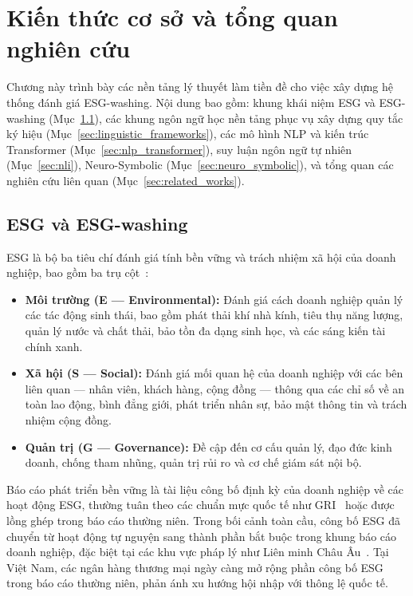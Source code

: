 \chapter{Kiến thức cơ sở và tổng quan nghiên cứu}
\label{ch:theory}

Chương này trình bày các nền tảng lý thuyết làm tiền đề cho việc xây dựng hệ thống đánh giá ESG-washing. Nội dung bao gồm: khung khái niệm ESG và ESG-washing (Mục~\ref{sec:esg_framework}), các khung ngôn ngữ học nền tảng phục vụ xây dựng quy tắc ký hiệu (Mục~\ref{sec:linguistic_frameworks}), các mô hình NLP và kiến trúc Transformer (Mục~\ref{sec:nlp_transformer}), suy luận ngôn ngữ tự nhiên (Mục~\ref{sec:nli}), Neuro-Symbolic (Mục~\ref{sec:neuro_symbolic}), và tổng quan các nghiên cứu liên quan (Mục~\ref{sec:related_works}).

\section{ESG và ESG-washing}
\label{sec:esg_framework}

ESG là bộ ba tiêu chí đánh giá tính bền vững và trách nhiệm xã hội của doanh nghiệp, bao gồm ba trụ cột~\cite{buchetti2025literature}:

\begin{itemize}
    \item \textbf{Môi trường (E --- Environmental):} Đánh giá cách doanh nghiệp quản lý các tác động sinh thái, bao gồm phát thải khí nhà kính, tiêu thụ năng lượng, quản lý nước và chất thải, bảo tồn đa dạng sinh học, và các sáng kiến tài chính xanh.
    \item \textbf{Xã hội (S --- Social):} Đánh giá mối quan hệ của doanh nghiệp với các bên liên quan --- nhân viên, khách hàng, cộng đồng --- thông qua các chỉ số về an toàn lao động, bình đẳng giới, phát triển nhân sự, bảo mật thông tin và trách nhiệm cộng đồng.
    \item \textbf{Quản trị (G --- Governance):} Đề cập đến cơ cấu quản lý, đạo đức kinh doanh, chống tham nhũng, quản trị rủi ro và cơ chế giám sát nội bộ.
\end{itemize}

Báo cáo phát triển bền vững là tài liệu công bố định kỳ của doanh nghiệp về các hoạt động ESG, thường tuân theo các chuẩn mực quốc tế như GRI~\cite{gri2021gri} hoặc được lồng ghép trong báo cáo thường niên. Trong bối cảnh toàn cầu, công bố ESG đã chuyển từ hoạt động tự nguyện sang thành phần bắt buộc trong khung báo cáo doanh nghiệp, đặc biệt tại các khu vực pháp lý như Liên minh Châu Âu~\cite{lagasio2024esg}. Tại Việt Nam, các ngân hàng thương mại ngày càng mở rộng phần công bố ESG trong báo cáo thường niên, phản ánh xu hướng hội nhập với thông lệ quốc tế.

